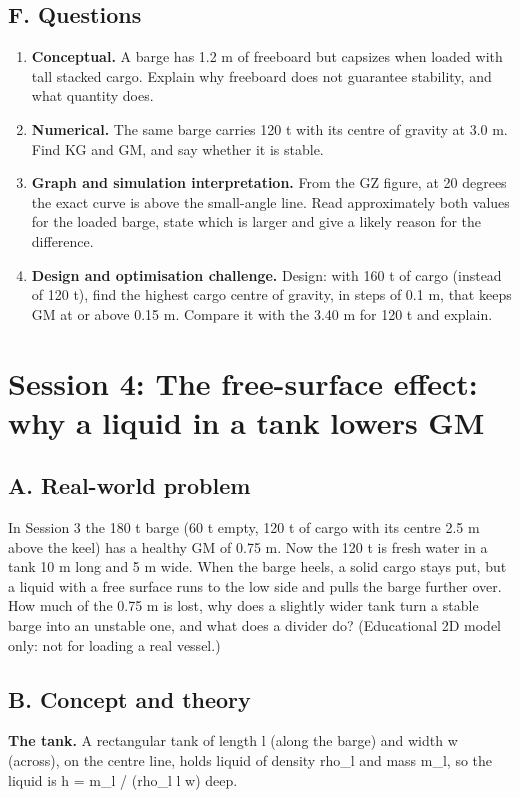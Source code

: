 \documentclass[11pt,a4paper]{article}
\begin{document}
\subsection*{F. Questions}
\begin{enumerate}[nosep]
\item \textbf{Conceptual.} A barge has 1.2 m of freeboard but capsizes when loaded with tall stacked cargo. Explain why freeboard does not guarantee stability, and what quantity does.
\item \textbf{Numerical.} The same barge carries 120 t with its centre of gravity at 3.0 m. Find KG and GM, and say whether it is stable.
\item \textbf{Graph and simulation interpretation.} From the GZ figure, at 20 degrees the exact curve is above the small-angle line. Read approximately both values for the loaded barge, state which is larger and give a likely reason for the difference.
\item \textbf{Design and optimisation challenge.} Design: with 160 t of cargo (instead of 120 t), find the highest cargo centre of gravity, in steps of 0.1 m, that keeps GM at or above 0.15 m. Compare it with the 3.40 m for 120 t and explain.
\end{enumerate}

\section{Session 4: The free-surface effect: why a liquid in a tank lowers GM}

\subsection*{A. Real-world problem}
In Session 3 the 180 t barge (60 t empty, 120 t of cargo with its centre 2.5 m above the keel) has a healthy GM of 0.75 m. Now the 120 t is fresh water in a tank 10 m long and 5 m wide. When the barge heels, a solid cargo stays put, but a liquid with a free surface runs to the low side and pulls the barge further over. How much of the 0.75 m is lost, why does a slightly wider tank turn a stable barge into an unstable one, and what does a divider do? (Educational 2D model only: not for loading a real vessel.)

\subsection*{B. Concept and theory}
\textbf{The tank.} A rectangular tank of length l (along the barge) and width w (across), on the centre line, holds liquid of density rho\_l and mass m\_l, so the liquid is h = m\_l / (rho\_l l w) deep.
\end{document}
